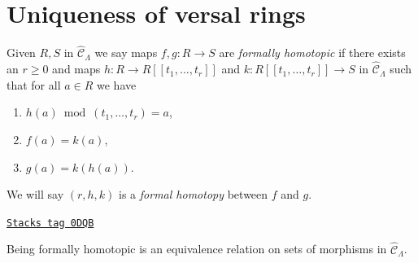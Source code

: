 \section{Uniqueness of versal rings}
\label{formal-defos-section-uniqueness}
Given $R, S$ in $\widehat{\mathcal{C}}_\Lambda$ we say maps
$f, g : R \to S$ are {\it formally homotopic} if there exists an
$r \geq 0$ and maps $h : R \to R[[t_1, \ldots, t_r]]$ and
$k : R[[t_1, \ldots, t_r]] \to S$ in $\widehat{\mathcal{C}}_\Lambda$
such that for all $a \in R$ we have
\begin{enumerate}
\item $h(a) \bmod (t_1, \ldots, t_r) = a$,
\item $f(a) = k(a)$,
\item $g(a) = k(h(a))$.
\end{enumerate}
We will say $(r, h, k)$ is a {\it formal homotopy} between $f$ and $g$.

\begin{lemma}[Homotopy]
\label{formal-defos-lemma-homotopy}
\href{https://stacks.math.columbia.edu/tag/0DQB}{\texttt{Stacks tag 0DQB}}

Being formally homotopic is an equivalence relation on
sets of morphisms in $\widehat{\mathcal{C}}_\Lambda$.
\end{lemma}

